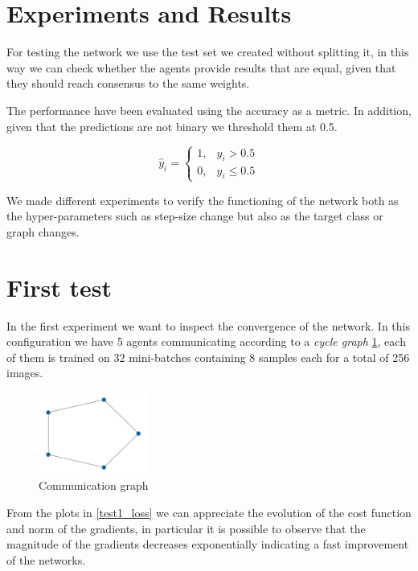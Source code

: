 \documentclass[a4paper,11pt,oneside]{book}
\begin{document}
\section{Experiments and Results}
For testing the network we use the test set we created without splitting it, in this way we can check whether the agents provide results that are equal, given that they should reach consensus to the same weights. 

\bigskip
The performance have been evaluated using the accuracy as a metric. In addition, given that the predictions are not binary we threshold them at 0.5.

\begin{equation}
\hat{y}_i = 
\begin{cases}
1, & \hat{y}_i > 0.5 \\
0, & \hat{y}_i \le 0.5
\end{cases}
\end{equation}

We made different experiments to verify the functioning of the network both as the hyper-parameters such as step-size change but also as the target class or graph changes.

\section{First test}
In the first experiment we want to inspect the convergence of the network. In this configuration we have 5 agents communicating according to a \textit{cycle graph} \ref{test1_graph}, each of them is trained on 32 mini-batches containing 8 samples each for a total of 256 images. 

\begin{figure}[h]
    \centering
    \includegraphics[width=0.32\textwidth]{test1/Graph}
    \caption{Communication graph}
    \label{test1_graph}
\end{figure}

From the plots in \ref{test1_loss} we can appreciate the evolution of the cost function and norm of the gradients, in particular it is possible to observe that the magnitude of the gradients decreases exponentially indicating a fast improvement of the networks.
\end{document}
